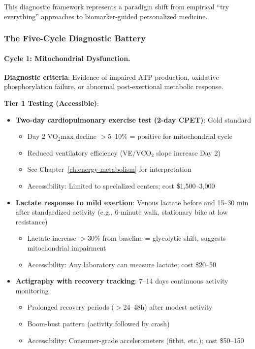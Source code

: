 This diagnostic framework represents a paradigm shift from empirical ``try everything'' approaches to biomarker-guided personalized medicine.

\subsubsection{The Five-Cycle Diagnostic Battery}

\paragraph{Cycle 1: Mitochondrial Dysfunction.}

\textbf{Diagnostic criteria}: Evidence of impaired ATP production, oxidative phosphorylation failure, or abnormal post-exertional metabolic response.

\textbf{Tier 1 Testing (Accessible)}:
\begin{itemize}
    \item \textbf{Two-day cardiopulmonary exercise test (2-day CPET)}: Gold standard
    \begin{itemize}
        \item Day 2 VO$_2$max decline $>$5--10\% = positive for mitochondrial cycle
        \item Reduced ventilatory efficiency (VE/VCO$_2$ slope increase Day 2)
        \item See Chapter~\ref{ch:energy-metabolism} for interpretation
        \item Accessibility: Limited to specialized centers; cost \$1,500--3,000
    \end{itemize}

    \item \textbf{Lactate response to mild exertion}: Venous lactate before and 15--30 min after standardized activity (e.g., 6-minute walk, stationary bike at low resistance)
    \begin{itemize}
        \item Lactate increase $>$30\% from baseline = glycolytic shift, suggests mitochondrial impairment
        \item Accessibility: Any laboratory can measure lactate; cost \$20--50
    \end{itemize}

    \item \textbf{Actigraphy with recovery tracking}: 7--14 days continuous activity monitoring
    \begin{itemize}
        \item Prolonged recovery periods ($>$24--48h) after modest activity
        \item Boom-bust pattern (activity followed by crash)
        \item Accessibility: Consumer-grade accelerometers (fitbit, etc.); cost \$50--150
    \end{itemize}
\end{itemize}

